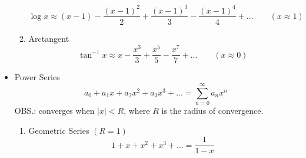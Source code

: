 \begin{itemize}
\begin{enumerate}
\begin{equation}
					\end{equation}
					\begin{equation}
						\log x \approx (x-1) - \frac{(x-1)^2}{2} + \frac{(x-1)^3}{3} - \frac{(x-1)^4}{4} + ... \qquad (x \approx 1)
					\end{equation}
				\item Arctangent
					\begin{equation}
						\tan^{-1} x \approx x - \frac{x^3}{3} + \frac{x^5}{5} - \frac{x^7}{7} + ... \qquad (x \approx 0)
					\end{equation}
			\end{enumerate}
		\item Power Series
			\begin{equation}
				a_0 + a_1x+a_2x^2+a_3x^3+...=\sum_{n=0}^{\infty} a_nx^n
			\end{equation}
			OBS.: converges when $|x|<R$, where $R$ is the radius of convergence.
			\begin{enumerate}
				\item Geometric Series $(R=1)$
					\begin{equation}
						1+x+x^2+x^3+... = \frac{1}{1-x}
					\end{equation}
			\end{enumerate}
	\end{itemize}
